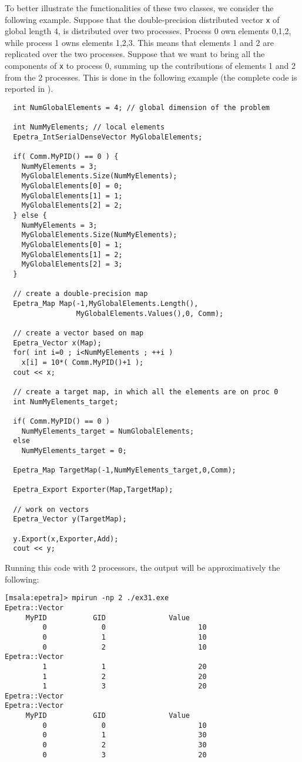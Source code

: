 To better illustrate the functionalities of these two classes, we
consider the following example. Suppose that the double-precision
distributed vector \verb!x! of global length 4, is distributed over two
processes. Process 0 own elements 0,1,2, while process 1 owns elements
1,2,3. This means that elements 1 and 2 are replicated over the two
processes. Suppose that we want to bring all the components of \verb!x!
to process 0, summing up the contributions of elements 1 and 2 from the
2 processes. This is done in the following example (the complete code is
reported in ).
\begin{verbatim}
  int NumGlobalElements = 4; // global dimension of the problem

  int NumMyElements; // local elements
  Epetra_IntSerialDenseVector MyGlobalElements;

  if( Comm.MyPID() == 0 ) {
    NumMyElements = 3;
    MyGlobalElements.Size(NumMyElements);
    MyGlobalElements[0] = 0;
    MyGlobalElements[1] = 1;
    MyGlobalElements[2] = 2;
  } else {
    NumMyElements = 3;
    MyGlobalElements.Size(NumMyElements);
    MyGlobalElements[0] = 1;
    MyGlobalElements[1] = 2;
    MyGlobalElements[2] = 3;
  }

  // create a double-precision map
  Epetra_Map Map(-1,MyGlobalElements.Length(),
                 MyGlobalElements.Values(),0, Comm);

  // create a vector based on map
  Epetra_Vector x(Map);
  for( int i=0 ; i<NumMyElements ; ++i )
    x[i] = 10*( Comm.MyPID()+1 );
  cout << x;

  // create a target map, in which all the elements are on proc 0
  int NumMyElements_target;

  if( Comm.MyPID() == 0 )
    NumMyElements_target = NumGlobalElements;
  else
    NumMyElements_target = 0;

  Epetra_Map TargetMap(-1,NumMyElements_target,0,Comm);

  Epetra_Export Exporter(Map,TargetMap);

  // work on vectors
  Epetra_Vector y(TargetMap);

  y.Export(x,Exporter,Add);
  cout << y;
\end{verbatim}

Running this code with 2 processors, the output will be approximatively
the following:
\begin{verbatim}
[msala:epetra]> mpirun -np 2 ./ex31.exe
Epetra::Vector
     MyPID           GID               Value
         0             0                      10
         0             1                      10
         0             2                      10
Epetra::Vector
         1             1                      20
         1             2                      20
         1             3                      20
Epetra::Vector
Epetra::Vector
     MyPID           GID               Value
         0             0                      10
         0             1                      30
         0             2                      30
         0             3                      20
\end{verbatim}


